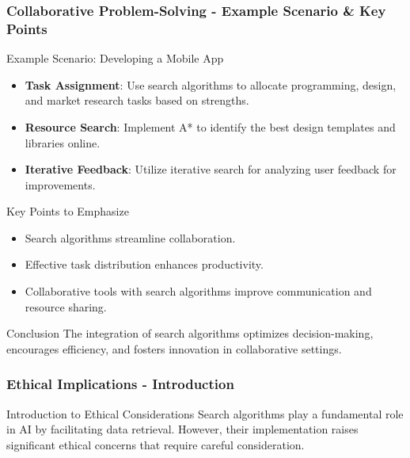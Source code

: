 \documentclass[aspectratio=169]{beamer}
\begin{document}
\begin{frame}[fragile]
    \frametitle{Collaborative Problem-Solving - Example Scenario & Key Points}
    \begin{block}{Example Scenario: Developing a Mobile App}
        \begin{itemize}
            \item \textbf{Task Assignment}: Use search algorithms to allocate programming, design, and market research tasks based on strengths.
            \item \textbf{Resource Search}: Implement A* to identify the best design templates and libraries online.
            \item \textbf{Iterative Feedback}: Utilize iterative search for analyzing user feedback for improvements.
        \end{itemize}
    \end{block}
    
    \begin{block}{Key Points to Emphasize}
        \begin{itemize}
            \item Search algorithms streamline collaboration.
            \item Effective task distribution enhances productivity.
            \item Collaborative tools with search algorithms improve communication and resource sharing.
        \end{itemize}
    \end{block}
    
    \begin{block}{Conclusion}
        The integration of search algorithms optimizes decision-making, encourages efficiency, and fosters innovation in collaborative settings.
    \end{block}
\end{frame}

\begin{frame}[fragile]
  \frametitle{Ethical Implications - Introduction}
  \begin{block}{Introduction to Ethical Considerations}
    Search algorithms play a fundamental role in AI by facilitating data retrieval. 
    However, their implementation raises significant ethical concerns that require careful consideration.
  \end{block}
\end{frame}
\end{document}
